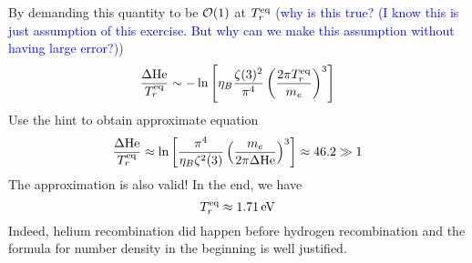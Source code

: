 \begin{enumerate}[label=(\alph*)]
      By demanding this quantity to be $\order{1}$ at $T^{\text{eq}}_r$ (\textcolor{blue}{why is this true? (I know this is just assumption of this exercise. But why can we make this assumption without having large error?)})
      \begin{equation*}
         \frac{\Delta \text{He}}{T_r^{\text{eq}}} \sim - \ln \left[ \eta_B \frac{\zeta(3)^2}{\pi^4} \left( \frac{2\pi T^{\text{eq}}_r}{m_e} \right)^3 \right] 
      \end{equation*}
      Use the hint to obtain approximate equation
      \begin{align}
         \frac{\Delta \text{He}}{T_r^{\text{eq}}} \approx \ln \left[ \frac{\pi^4}{\eta_B \zeta^2(3)} \left( \frac{m_e}{2 \pi \Delta\text{He}} \right)^3 \right] \approx 46.2 \gg 1
      \end{align}
      The approximation is also valid! In the end, we have
      \begin{equation}
         T_r^\eq \approx \SI{1.71}{\eV}
      \end{equation}
      Indeed, helium recombination did happen before hydrogen recombination and the formula for number density in the beginning is well justified.
\end{enumerate}
